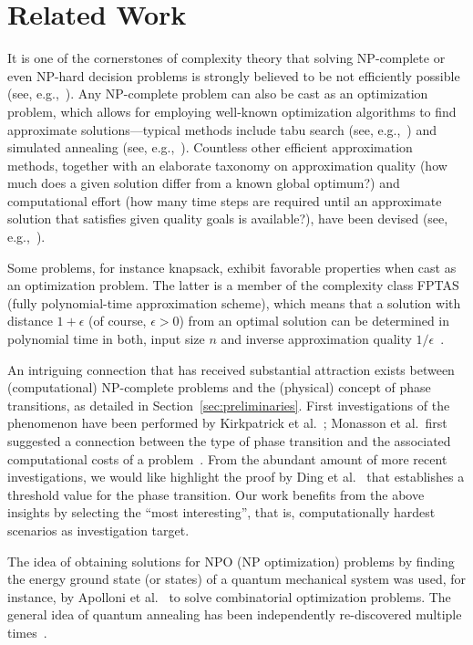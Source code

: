 \section{Related Work}
\label{sec:related-work}

It is one of the cornerstones of complexity theory that solving NP-complete or even NP-hard decision problems is strongly believed to be not efficiently possible (see, e.g.,~\cite{cook1971complexity,murty1987some}). Any NP-complete problem can also be cast as an optimization problem, which allows for employing well-known optimization algorithms to find approximate solutions---typical methods include tabu search (see, e.g.,~\cite{glover2013tabu,gendreau1994tabu}) and simulated annealing (see, e.g.,~\cite{kirkpatrick1983optimization,chen1995chaotic}). Countless other efficient approximation methods, together with an elaborate taxonomy on approximation quality (how much does a given solution differ from a known global optimum?) and computational effort (how many time steps are required until an approximate solution that satisfies given quality goals is available?), have been devised (see, e.g.,~\cite{Ausiello1999}).

Some problems, for instance knapsack, exhibit favorable properties when cast as an optimization problem. The latter is a member of the complexity class FPTAS (fully polynomial-time approximation scheme), which means that a solution with distance \(1+\epsilon\) (of course, $\epsilon > 0$) from an optimal solution can be determined in polynomial time in both, input size \(n\) and inverse approximation quality \(1/\epsilon\)~\cite{chen1995chaotic}.

An intriguing connection that has received substantial attraction exists between (computational) NP-complete problems and the (physical) concept of phase transitions, as detailed in Section~\ref{sec:preliminaries}. First investigations of the phenomenon have been performed by Kirkpatrick et al.~\cite{kirkpatrick1994critical}; Monasson et al.\ first suggested a connection between the type of phase transition and the associated computational costs of a problem~\cite{monasson1999determining}. From the abundant amount of more recent investigations, we would like highlight the proof by Ding et al.~\cite{ding2015proof} that establishes a threshold value for the phase transition. Our work benefits from the above insights by selecting the ``most interesting'', that is, computationally hardest scenarios as investigation target.

The idea of obtaining solutions for NPO (NP optimization) problems by finding the energy ground state (or states) of a quantum mechanical system was used, for instance, by Apolloni et al.~\cite{apolloni1989quantum,apolloni1988numerical} to solve combinatorial optimization problems. The general idea of quantum annealing has been independently re-discovered multiple times~\cite{albash2016adiabatic,finnila1994quantum,amara1993global,kadowaki1998quantum}.

